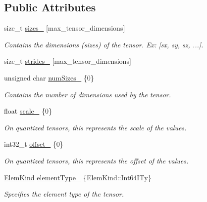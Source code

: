 \subsection*{Public Attributes}
\begin{DoxyCompactItemize}
\item 
size\+\_\+t \hyperlink{structglow_1_1_type_a7725158c5337a8e6787a090c9a403cc1}{sizes\+\_\+} \mbox{[}max\+\_\+tensor\+\_\+dimensions\mbox{]}
\begin{DoxyCompactList}\small\item\em Contains the dimensions (sizes) of the tensor. Ex\+: \mbox{[}sx, sy, sz, ...\mbox{]}. \end{DoxyCompactList}\item 
size\+\_\+t \hyperlink{structglow_1_1_type_ab1f4da2b41f26f88cc94db137d1a1cac}{strides\+\_\+} \mbox{[}max\+\_\+tensor\+\_\+dimensions\mbox{]}
\item 
\mbox{\label{structglow_1_1_type_aab431e748a0e590b796428656af802de}} 
unsigned char \hyperlink{structglow_1_1_type_aab431e748a0e590b796428656af802de}{num\+Sizes\+\_\+} \{0\}
\begin{DoxyCompactList}\small\item\em Contains the number of dimensions used by the tensor. \end{DoxyCompactList}\item 
\mbox{\label{structglow_1_1_type_a9e25dca90eb66089c5c063918801c251}} 
float \hyperlink{structglow_1_1_type_a9e25dca90eb66089c5c063918801c251}{scale\+\_\+} \{0\}
\begin{DoxyCompactList}\small\item\em On quantized tensors, this represents the scale of the values. \end{DoxyCompactList}\item 
\mbox{\label{structglow_1_1_type_a646c53012cad9f3be1692d7e2623a9b6}} 
int32\+\_\+t \hyperlink{structglow_1_1_type_a646c53012cad9f3be1692d7e2623a9b6}{offset\+\_\+} \{0\}
\begin{DoxyCompactList}\small\item\em On quantized tensors, this represents the offset of the values. \end{DoxyCompactList}\item 
\mbox{\label{structglow_1_1_type_ac3c2bbcd9232163c6336888cdf19d01e}} 
\hyperlink{namespaceglow_ab92e14a94329daf4083db670e95fbcdf}{Elem\+Kind} \hyperlink{structglow_1_1_type_ac3c2bbcd9232163c6336888cdf19d01e}{element\+Type\+\_\+} \{Elem\+Kind\+::\+Int64\+I\+Ty\}
\begin{DoxyCompactList}\small\item\em Specifies the element type of the tensor. \end{DoxyCompactList}\end{DoxyCompactItemize}


